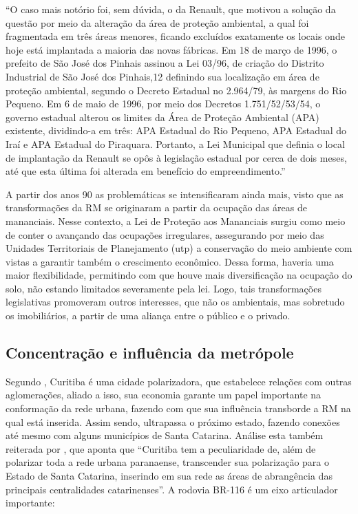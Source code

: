 	\begin{citacao}
		``O caso mais notório foi, sem dúvida, o da Renault, que motivou a solução da questão por meio da alteração da área de proteção ambiental, a qual foi fragmentada em três áreas menores, ficando excluídos exatamente os locais onde hoje está implantada a maioria das novas fábricas. Em 18 de março de 1996, o prefeito de São José dos Pinhais assinou a Lei 03/96, de criação do Distrito Industrial de São José dos Pinhais,12 definindo sua localização em área de proteção ambiental, segundo o Decreto Estadual no 2.964/79, às margens do Rio Pequeno. Em 6 de maio de 1996, por meio dos Decretos 1.751/52/53/54, o governo estadual alterou os limites da Área de Proteção Ambiental (APA) existente, dividindo-a em três: APA Estadual do Rio Pequeno, APA Estadual do Iraí e APA Estadual do Piraquara. Portanto, a Lei Municipal que definia o local de implantação da Renault se opôs à legislação estadual por cerca de dois meses, até que esta última foi alterada em benefício do empreendimento.'' \cite[p. 96]{firkowski2002b}
	\end{citacao}

	A partir dos anos 90 as problemáticas se intensificaram ainda mais, visto que as transformações da RM se originaram a partir da ocupação das áreas de mananciais. Nesse contexto, a Lei de Proteção aos Mananciais surgiu como meio de conter o avançando das ocupações irregulares, assegurando por meio das Unidades Territoriais de Planejamento (\gls{utp}) a conservação do meio ambiente com vistas a garantir também o crescimento econômico. Dessa forma, haveria uma maior flexibilidade, permitindo com que houve mais diversificação na ocupação do solo, não estando limitados severamente pela lei. Logo, tais transformações legislativas promoveram outros interesses, que não os ambientais, mas sobretudo os imobiliários, a partir de uma aliança entre o público e o privado.
	
	\subsection{Concentração e influência da metrópole}
		
	Segundo , Curitiba é uma cidade polarizadora, que estabelece relações com outras aglomerações, aliado a isso, sua economia garante um papel importante na conformação da rede urbana, fazendo com que sua influência transborde a RM na qual está inserida. Assim sendo, ultrapassa o próximo estado, fazendo conexões até mesmo com alguns municípios de Santa Catarina. Análise esta também reiterada por , que aponta que ``Curitiba tem a peculiaridade de, além de polarizar toda a rede urbana paranaense, transcender sua polarização para o Estado de Santa Catarina, inserindo em sua rede as áreas de abrangência das principais centralidades catarinenses''. A rodovia BR-116 é um eixo articulador importante:
	
